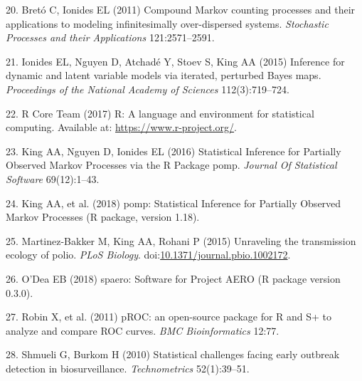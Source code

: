 \documentclass[3p]{elsarticle} %
\begin{document}
\hypertarget{ref-Breto2011}{}
20. Bretó C, Ionides EL (2011) Compound Markov counting processes and
their applications to modeling infinitesimally over-dispersed systems.
\emph{Stochastic Processes and their Applications} 121:2571--2591.

\hypertarget{ref-Ionides2015}{}
21. Ionides EL, Nguyen D, Atchadé Y, Stoev S, King AA (2015) Inference
for dynamic and latent variable models via iterated, perturbed Bayes
maps. \emph{Proceedings of the National Academy of Sciences}
112(3):719--724.

\hypertarget{ref-R2017}{}
22. R Core Team (2017) R: A language and environment for statistical
computing. Available at: \url{https://www.r-project.org/}.

\hypertarget{ref-King2016}{}
23. King AA, Nguyen D, Ionides EL (2016) Statistical Inference for
Partially Observed Markov Processes via the R Package pomp.
\emph{Journal Of Statistical Software} 69(12):1--43.

\hypertarget{ref-King2018}{}
24. King AA, et al. (2018) pomp: Statistical Inference for Partially
Observed Markov Processes (R package, version 1.18).

\hypertarget{ref-Martinez-Bakker2015}{}
25. Martinez-Bakker M, King AA, Rohani P (2015) Unraveling the
transmission ecology of polio. \emph{PLoS Biology}.
doi:\href{https://doi.org/10.1371/journal.pbio.1002172}{10.1371/journal.pbio.1002172}.

\hypertarget{ref-ODea2018}{}
26. O'Dea EB (2018) spaero: Software for Project AERO (R package version
0.3.0).

\hypertarget{ref-Robin2011}{}
27. Robin X, et al. (2011) pROC: an open-source package for R and S+ to
analyze and compare ROC curves. \emph{BMC Bioinformatics} 12:77.

\hypertarget{ref-Shmueli2010}{}
28. Shmueli G, Burkom H (2010) Statistical challenges facing early
outbreak detection in biosurveillance. \emph{Technometrics}
52(1):39--51.
\end{document}
